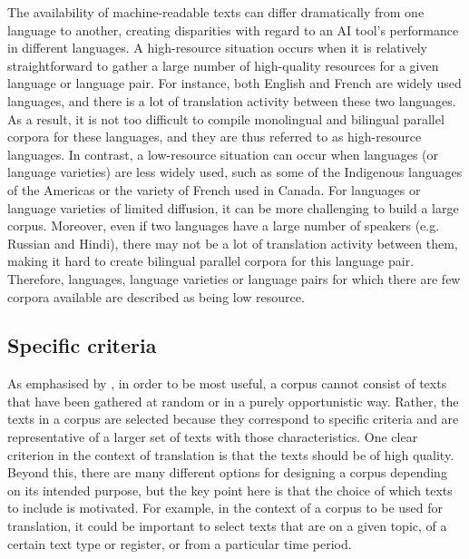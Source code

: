 \documentclass[output=paper]{langscibook}
\begin{document}
The availability of machine-readable texts can differ dramatically from one language to another, creating disparities with regard to an AI tool’s performance in different languages. A high-resource situation occurs when it is relatively straightforward to gather a large number of high-quality resources for a given language or language pair. For instance, both English and French are widely used languages, and there is a lot of translation activity between these two languages. As a result, it is not too difficult to compile monolingual and bilingual parallel corpora for these languages, and they are thus referred to as high-resource languages. In contrast, a low-resource situation can occur when languages (or language varieties) are less widely used, such as some of the Indigenous languages of the Americas or the variety of French used in Canada. For languages or language varieties of limited diffusion, it can be more challenging to build a large corpus. Moreover, even if two languages have a large number of speakers (e.g. Russian and Hindi), there may not be a lot of translation activity between them, making it hard to create bilingual parallel corpora for this language pair. Therefore, languages, language varieties or language pairs for which there are few corpora available are described as being low resource.

\subsection{Specific criteria}\label{sec:4:2.1.3}
As emphasised by \citet{mcenery22}, in order to be most useful, a corpus cannot consist of texts that have been gathered at random or in a purely opportunistic way. Rather, the texts in a corpus are selected because they correspond to specific criteria and are representative of a larger set of texts with those characteristics. One clear criterion in the context of translation is that the texts should be of high quality. Beyond this, there are many different options for designing a corpus depending on its intended purpose, but the key point here is that the choice of which texts to include is motivated. For example, in the context of a corpus to be used for translation, it could be important to select texts that are on a given topic, of a certain text type or register, or from a particular time period. 
\end{document}
